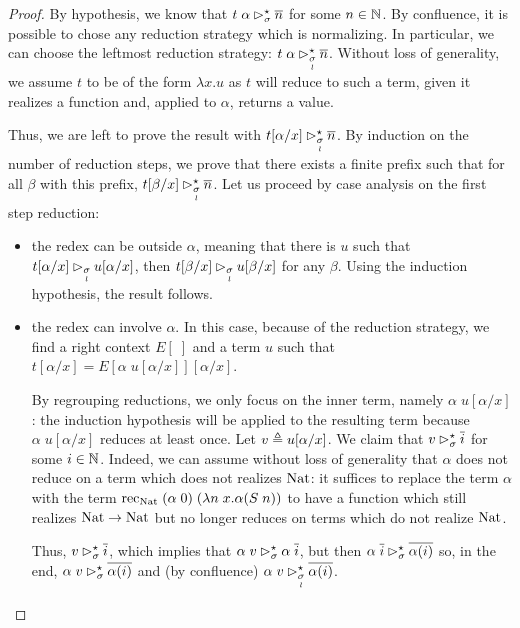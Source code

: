 \documentclass[a4paper,UKenglish,cleveref, autoref, thm-restate]{lipics-v2021}
\begin{document}
\begin{proof}
 By hypothesis, we know that $t\;\alpha \rhd^{\star}_{\sigma} \overline n$ for some $n \in \mathbb N$. By confluence, it is possible to chose any reduction strategy which is normalizing. In particular, we can choose the leftmost reduction strategy:
  $t\;\alpha \rhd^{\star}_{\underset{l}{\sigma}} \overline n$.
  Without loss of generality, we assume $t$ to be of the form $\lambda x.u$ as $t$ will reduce to such a term, given it realizes a function and, applied to $\alpha$, returns a value.

  Thus, we are left to prove the result with $t[\alpha/x] \rhd^{\star}_{\underset{l}{\sigma}} \overline n$. By induction on the number of reduction steps, we prove that there exists a finite prefix such that for all $\beta$ with this prefix, $t[\beta/x] \rhd^{\star}_{\underset{l}{\sigma}} \overline n$. Let us proceed by case analysis on the first step reduction:
  \begin{itemize}
  \item the redex can be outside $\alpha$, meaning that there is $u$ such that $t[\alpha/x] \rhd_{\underset{l}{\sigma}} u[\alpha/x]$, then $t[\beta/x] \rhd_{\underset{l}{\sigma}} u[\beta/x]$ for any $\beta$. Using the induction hypothesis, the result follows.
  \item the redex can involve $\alpha$. In this case, because of the reduction strategy, we find a right context $E[\;]$ and a term $u$ such that
    $t[\alpha/x] = E[\alpha\;u[\alpha/x]][\alpha/x]$.

    By regrouping reductions, we only focus on the inner term, namely $\alpha\;u[\alpha/x]$: the induction hypothesis will be applied to the resulting term because $\alpha\;u[\alpha/x]$ reduces at least once. Let $v \triangleq u[\alpha/x]$.
    We claim that $v \rhd^{\star}_{\sigma} \overline i$ for some $i \in \mathbb N$. Indeed, we can assume without loss of generality that $\alpha$ does not reduce on a term which does not realizes $\mathrm{Nat}$: it suffices to replace the term $\alpha$ with the term
    $\mathrm{rec}_{\mathrm{Nat}}\;(\alpha\;0)\;(\lambda n\;x. \alpha(S\;n))$
    to have a function which still realizes $\mathrm{Nat} \to \mathrm{Nat}$ but no longer reduces on terms which do not realize $\mathrm{Nat}$.

    Thus, $v \rhd^{\star}_{\sigma} \overline i$, which implies that $\alpha\;v \rhd^{\star}_{\sigma} \alpha \;\overline i$, but then $\alpha\;\overline i \rhd^{\star}_{\sigma} \overline{\alpha(i)}$ so, in the end,
    $\alpha\;v \rhd^{\star}_{\sigma} \overline{\alpha(i)}$ and (by confluence)
    $\alpha\;v \rhd^{\star}_{\underset{l}{\sigma}} \overline{\alpha(i)}$.


\end{itemize}
\end{proof}
\end{document}
